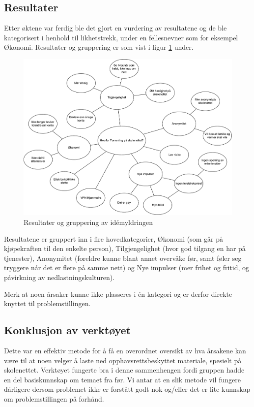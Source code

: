 \subsection{Resultater}
Etter øktene var ferdig ble det gjort en vurdering av resultatene og de ble kategorisert i henhold til likhetstrekk, under en fellesnevner som for eksempel Økonomi. Resultater og gruppering er som vist i figur \ref{fig:idemyldring} under.

\begin{figure}[H]
    \centering    \includegraphics[scale=0.45]{case_1/bilder/idemyldring}
    \caption[Idémyldring]{Resultater og gruppering av idémyldringen}
    \label{fig:idemyldring}
\end{figure}

Resultatene er gruppert inn i fire hovedkategorier, Økonomi (som går på kjøpekraften til den enkelte person), Tilgjengelighet (hvor god tilgang en har på tjenester), Anonymitet (foreldre kunne blant annet overvåke før, samt føler seg tryggere når det er flere på samme nett) og Nye impulser (mer frihet og fritid, og påvirkning av nedlastningskulturen).

Merk at noen årsaker kunne ikke plasseres i én kategori og er derfor direkte knyttet til problemstillingen. 


\subsection{Konklusjon av verktøyet}
Dette var en effektiv metode for å få en overordnet oversikt av hva årsakene kan være til at noen velger å laste ned opphavsrettsbeskyttet materiale, spesielt på skolenettet. Verktøyet fungerte bra i denne sammenhengen fordi gruppen hadde en del basiskunnskap om temaet fra før. Vi antar at en slik metode vil fungere dårligere dersom problemet ikke er forstått godt nok og/eller det er lite kunnskap om problemstillingen på forhånd.